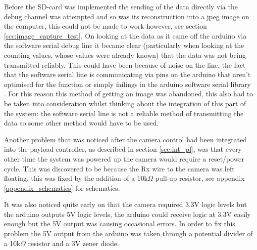 Before the SD-card was implemented the sending of the data directly via the debug channel was attempted and so was its reconstruction into a jpeg image on the computer, this could not be made to work however, see section \ref{sec:image_capture_test}. On looking at the data as it came off the arduino via the software serial debug line it became clear (particularly when looking at the counting values, whose values were already known) that the data was not being transmitted reliably. This could have been because of noise on the line, the fact that the software serial line is communicating via pins on the arduino that aren't optimised for the function or simply failings in the arduino software serial library \cite{software_serial}. For this reason this method of getting an image was abandoned, this also had to be taken into consideration whilst thinking about the integration of this part of the system: the software serial line is not a reliable method of transmitting the data so some other method would have to be used.

Another problem that was noticed after the camera control had been integrated into the payload controller, as described in section \ref{sec:int_pl}, was that every other time the system was powered up the camera would require a reset/power cycle. This was discovered to be because the Rx wire to the camera was left floating, this was fixed by the addition of a 10k$\Omega$ pull-up resistor, see appendix \ref{appendix_schematics} for schematics.

It was also noticed quite early on that the camera required 3.3V logic \cite{ucam_datasheet} levels but the arduino outputs 5V logic levels, the arduino could receive logic at 3.3V easily enough but the 5V output was causing occasional errors. In order to fix this problem the 5V output from the arduino was taken through a potential divider of a 10k$\Omega$ resistor and a 3V zener diode.
